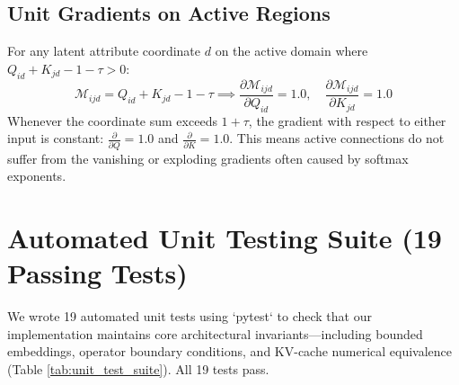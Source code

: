 \subsection{Unit Gradients on Active Regions}
For any latent attribute coordinate $d$ on the active domain where $Q_{id} + K_{jd} - 1 - \tau > 0$:
\begin{equation}
\mathcal{M}_{ijd} = Q_{id} + K_{jd} - 1 - \tau \implies \frac{\partial \mathcal{M}_{ijd}}{\partial Q_{id}} = 1.0, \quad \frac{\partial \mathcal{M}_{ijd}}{\partial K_{jd}} = 1.0
\end{equation}
Whenever the coordinate sum exceeds $1 + \tau$, the gradient with respect to either input is constant: $\frac{\partial}{\partial Q} = 1.0$ and $\frac{\partial}{\partial K} = 1.0$. This means active connections do not suffer from the vanishing or exploding gradients often caused by softmax exponents.

\section{Automated Unit Testing Suite (19 Passing Tests)}
We wrote 19 automated unit tests using `pytest` to check that our implementation maintains core architectural invariants—including bounded embeddings, operator boundary conditions, and KV-cache numerical equivalence (Table \ref{tab:unit_test_suite}). All 19 tests pass.

\begin{table}[h]
\centering
\caption{Automated Unit Testing Suite (19 Passing Tests)}
\label{tab:unit_test_suite}
\small
{}
\end{table}

